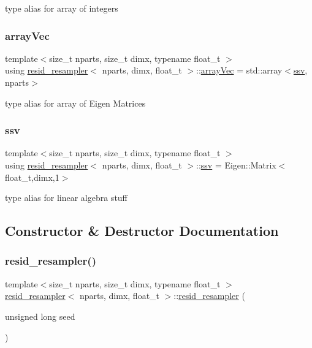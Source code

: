 type alias for array of integers \mbox{\label{classresid__resampler_a33ba5996cd3099fb81d9932bf5f460c0}} 
\subsubsection{\texorpdfstring{array\+Vec}{arrayVec}}
{\footnotesize\ttfamily template$<$size\+\_\+t nparts, size\+\_\+t dimx, typename float\+\_\+t $>$ \\
using \hyperlink{classresid__resampler}{resid\+\_\+resampler}$<$ nparts, dimx, float\+\_\+t $>$\+::\hyperlink{classrbase_aa12fc826befa6ba0647b5f59ebc396ee}{array\+Vec} =  std\+::array$<$\hyperlink{classrbase_ae20e0b8df15aa109252f57ecbf1f20f8}{ssv}, nparts$>$}

type alias for array of Eigen Matrices \mbox{\label{classresid__resampler_a500f44f0072a4d54b03762c946c38981}} 
\subsubsection{\texorpdfstring{ssv}{ssv}}
{\footnotesize\ttfamily template$<$size\+\_\+t nparts, size\+\_\+t dimx, typename float\+\_\+t $>$ \\
using \hyperlink{classresid__resampler}{resid\+\_\+resampler}$<$ nparts, dimx, float\+\_\+t $>$\+::\hyperlink{classrbase_ae20e0b8df15aa109252f57ecbf1f20f8}{ssv} =  Eigen\+::\+Matrix$<$float\+\_\+t,dimx,1$>$}

type alias for linear algebra stuff 

\subsection{Constructor \& Destructor Documentation}
\mbox{\label{classresid__resampler_a7c5a27732c78f6d30919ec4135f99228}} 
\subsubsection{\texorpdfstring{resid\+\_\+resampler()}{resid\_resampler()}}
{\footnotesize\ttfamily template$<$size\+\_\+t nparts, size\+\_\+t dimx, typename float\+\_\+t $>$ \\
\hyperlink{classresid__resampler}{resid\+\_\+resampler}$<$ nparts, dimx, float\+\_\+t $>$\+::\hyperlink{classresid__resampler}{resid\+\_\+resampler} (\begin{DoxyParamCaption}\item[{unsigned long}]{seed }\end{DoxyParamCaption})}



